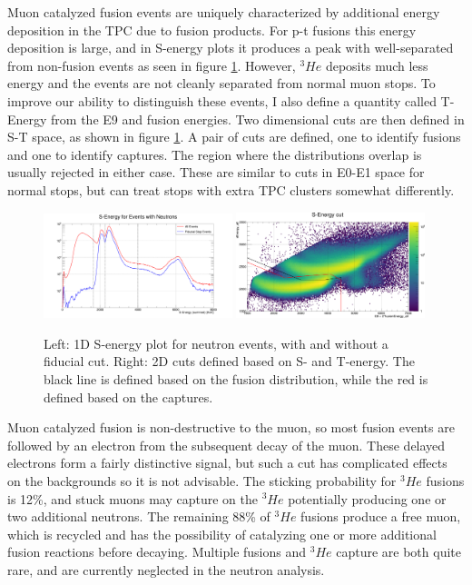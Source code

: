 Muon catalyzed fusion events are uniquely characterized by additional energy deposition in the TPC due to fusion products.  
For p-t fusions this energy deposition is large, and in S-energy plots it produces a peak with well-separated from non-fusion events as seen in figure \ref{fig:cuts_svt}.
However, $^3He$ deposits much less energy and the events are not cleanly separated from normal muon stops.  
To improve our ability to distinguish these events, I also define a quantity called T-Energy from the E9 and fusion energies.
Two dimensional cuts are then defined in S-T space, as shown in figure \ref{fig:cuts_svt}.
A pair of cuts are defined, one to identify fusions and one to identify captures.
The region where the distributions overlap is usually rejected in either case.
These are similar to cuts in E0-E1 space for normal stops, but can treat stops with extra TPC clusters somewhat differently.

\begin{figure}[h]
  \includegraphics[width=0.49\textwidth]{neutrons/figures/Cuts_SEnergy.png}
  \includegraphics[width=0.49\textwidth]{neutrons/figures/Cuts_SEnergyVsTEnergy.png}
  \caption{Left: 1D S-energy plot for neutron events, with and without a fiducial cut.  Right: 2D cuts defined based on S- and T-energy.  The black line is defined based on the fusion distribution, while the red is defined based on the captures.}
  \label{fig:cuts_svt}
\end{figure}

Muon catalyzed fusion is non-destructive to the muon, so most fusion events are followed by an electron from the subsequent decay of the muon.
These delayed electrons form a fairly distinctive signal, but such a cut has complicated effects on the backgrounds so it is not advisable.
The sticking probability for $^3He$ fusions is 12\%, and stuck muons may capture on the $^3He$ potentially producing one or two additional neutrons. 
The remaining 88\% of $^3He$ fusions produce a free muon, which is recycled and has the possibility of catalyzing one or more additional fusion reactions before decaying.
Multiple fusions and $^3He$ capture are both quite rare, and are currently neglected in the neutron analysis.

